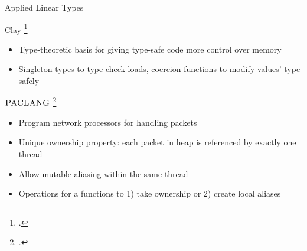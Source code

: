 \documentclass[aspectratio=169]{beamer}
\begin{document}

\begin{frame}{Applied Linear Types}
\footnotesize{
Clay \footcite{hawblitzel_low-level_2004}
  \begin{itemize}
    \item Type-theoretic basis for giving type-safe code more control over memory
    \item Singleton types to type check loads, coercion functions to modify values' type safely
  \end{itemize}

\pause

$\textsc{PACLANG}$ \footcite{ennals_linear_2004} %
  \begin{itemize}
    \item Program network processors for handling packets %
    \item Unique ownership property: each packet in heap is referenced by exactly one thread
    \item Allow mutable aliasing within the same thread
    \item Operations for a functions to 1) take ownership or 2) create local aliases
  \end{itemize}
}
\end{frame}
\end{document}
